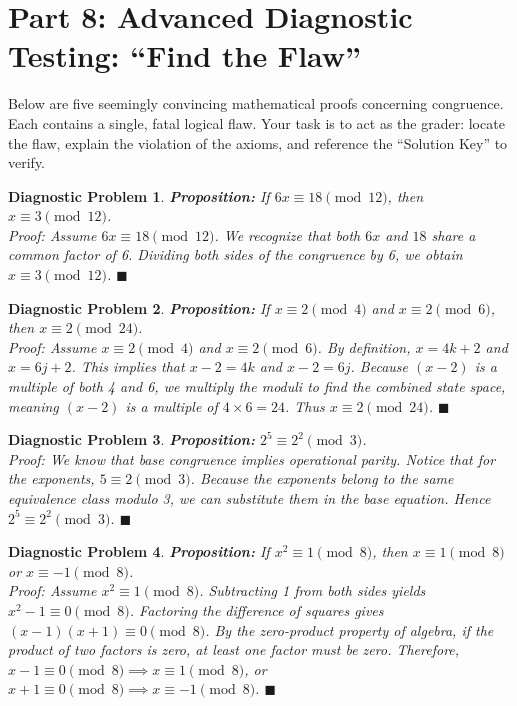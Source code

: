 \documentclass[11pt]{article}
\newtheorem{flawprob}{Diagnostic Problem}
\begin{document}
\newpage
\section{Part 8: Advanced Diagnostic Testing: ``Find the Flaw''}

Below are five seemingly convincing mathematical proofs concerning congruence. Each contains a single, fatal logical flaw. Your task is to act as the grader: locate the flaw, explain the violation of the axioms, and reference the ``Solution Key'' to verify.

\begin{flawprob}
\textbf{Proposition:} If $6x \equiv 18 \pmod{12}$, then $x \equiv 3 \pmod{12}$. \\
\textit{Proof:} Assume $6x \equiv 18 \pmod{12}$. We recognize that both $6x$ and $18$ share a common factor of 6. Dividing both sides of the congruence by 6, we obtain $x \equiv 3 \pmod{12}$. $\blacksquare$
\end{flawprob}

\begin{flawprob}
\textbf{Proposition:} If $x \equiv 2 \pmod 4$ and $x \equiv 2 \pmod 6$, then $x \equiv 2 \pmod{24}$. \\
\textit{Proof:} Assume $x \equiv 2 \pmod 4$ and $x \equiv 2 \pmod 6$. By definition, $x = 4k + 2$ and $x = 6j + 2$. This implies that $x - 2 = 4k$ and $x - 2 = 6j$. Because $(x - 2)$ is a multiple of both 4 and 6, we multiply the moduli to find the combined state space, meaning $(x - 2)$ is a multiple of $4 \times 6 = 24$. Thus $x \equiv 2 \pmod{24}$. $\blacksquare$
\end{flawprob}

\begin{flawprob}
\textbf{Proposition:} $2^5 \equiv 2^2 \pmod 3$. \\
\textit{Proof:} We know that base congruence implies operational parity. Notice that for the exponents, $5 \equiv 2 \pmod 3$. Because the exponents belong to the same equivalence class modulo 3, we can substitute them in the base equation. Hence $2^5 \equiv 2^2 \pmod 3$. $\blacksquare$
\end{flawprob}

\begin{flawprob}
\textbf{Proposition:} If $x^2 \equiv 1 \pmod 8$, then $x \equiv 1 \pmod 8$ or $x \equiv -1 \pmod 8$. \\
\textit{Proof:} Assume $x^2 \equiv 1 \pmod 8$. Subtracting 1 from both sides yields $x^2 - 1 \equiv 0 \pmod 8$. Factoring the difference of squares gives $(x - 1)(x + 1) \equiv 0 \pmod 8$. By the zero-product property of algebra, if the product of two factors is zero, at least one factor must be zero. Therefore, $x - 1 \equiv 0 \pmod 8 \implies x \equiv 1 \pmod 8$, or $x + 1 \equiv 0 \pmod 8 \implies x \equiv -1 \pmod 8$. $\blacksquare$
\end{flawprob}
\end{document}
